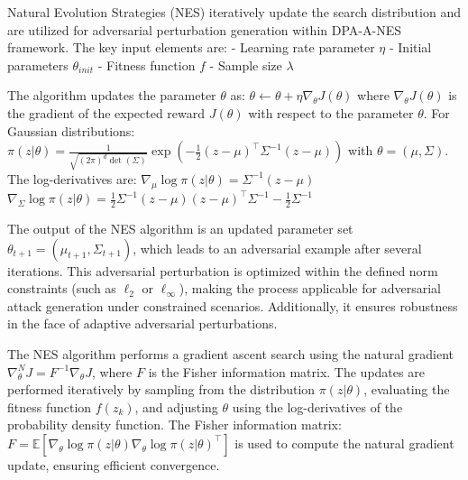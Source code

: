 Natural Evolution Strategies (NES) iteratively update the search distribution and are utilized for adversarial perturbation generation within DPA-A-NES framework. The key input elements are:
- Learning rate parameter $\eta$
- Initial parameters $\theta_{init}$
- Fitness function $f$
- Sample size $\lambda$
  
The algorithm updates the parameter $\theta$ as:
$\theta \leftarrow \theta + \eta \nabla_\theta J(\theta)$
where $\nabla_\theta J(\theta)$ is the gradient of the expected reward $J(\theta)$ with respect to the parameter $\theta$. For Gaussian distributions:
$\pi(z | \theta) = \frac{1}{\sqrt{(2\pi)^d \det(\Sigma)}} \exp \left( -\frac{1}{2} (z - \mu)^\top \Sigma^{-1} (z - \mu) \right)$
with $\theta = (\mu, \Sigma)$. The log-derivatives are:
$\nabla_\mu \log \pi (z | \theta) = \Sigma^{-1} (z - \mu)$
$\nabla_\Sigma \log \pi (z | \theta) = \frac{1}{2} \Sigma^{-1} (z - \mu) (z - \mu)^\top \Sigma^{-1} - \frac{1}{2} \Sigma^{-1}$

The output of the NES algorithm is an updated parameter set $\theta_{t+1} = (\mu_{t+1}, \Sigma_{t+1})$, which leads to an adversarial example after several iterations. This adversarial perturbation is optimized within the defined norm constraints (such as $\ell_2$ or $\ell_\infty$), making the process applicable for adversarial attack generation under constrained scenarios. Additionally, it ensures robustness in the face of adaptive adversarial perturbations.


The NES algorithm performs a gradient ascent search using the natural gradient $\nabla_\theta^N J = F^{-1} \nabla_\theta J$, where $F$ is the Fisher information matrix. The updates are performed iteratively by sampling from the distribution $\pi(z|\theta)$, evaluating the fitness function $f(z_k)$, and adjusting $\theta$ using the log-derivatives of the probability density function. The Fisher information matrix:
$F = \mathbb{E} \left[ \nabla_\theta \log \pi (z|\theta) \nabla_\theta \log \pi (z|\theta)^\top \right]$
is used to compute the natural gradient update, ensuring efficient convergence.


